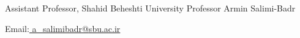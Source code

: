 \begin{cventries}
    \cventry
    {Assistant Professor, Shahid Beheshti University}
    {Professor Armin Salimi-Badr}
    {}
    {}
    {
      \begin{cvitems}
	    \item{Email:\href{mailto:a_salimibadr@sbu.ac.ir}{ a\_salimibadr{@}sbu.ac.ir}}
      \end{cvitems}
    }
\end{cventries}
